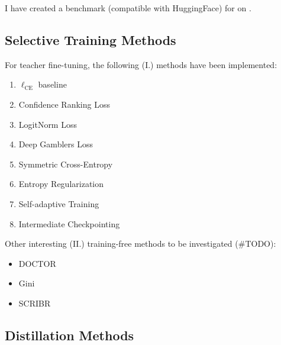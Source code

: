 I have created a benchmark (compatible with HuggingFace) for \KD{} on \DC{}.


\subsection{Selective Training Methods}

For teacher fine-tuning, the following (I.) methods have been implemented: 

\begin{enumerate}
    \item $\ell_{\mathrm{CE}}$ baseline 
    \item Confidence Ranking Loss \cite{moon2020confidence}
    \item LogitNorm Loss \cite{wei2022mitigating}
    \item Deep Gamblers Loss \cite{liu2019deep}
    \item Symmetric Cross-Entropy \cite{wang2019symmetric}
    \item Entropy Regularization \cite{feng2022stop} 
    \item Self-adaptive Training \cite{huang2020self}
    \item Intermediate Checkpointing \cite{wang2022efficient}
\end{enumerate}

Other interesting (II.) training-free methods to be investigated (\#TODO): 
\begin{itemize}
    \item DOCTOR \cite{granese2021doctor}
    \item Gini \cite{gomes2023a}
    \item SCRIBR \cite{lin2022scrib}
\end{itemize}

\subsection{Distillation Methods}

